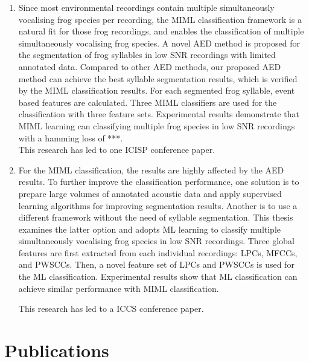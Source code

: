 \begin{enumerate}
\item Since most environmental recordings contain multiple simultaneously vocalising frog species per recording, the MIML classification framework is a natural fit for those frog recordings, and enables the classification of multiple simultaneously vocalising frog species. A novel AED method is proposed for the segmentation of frog syllables in low SNR recordings with limited annotated data. Compared to other AED methods, our proposed AED method can achieve the best syllable segmentation results, which is verified by the MIML classification results. For each segmented frog syllable, event based features are calculated. Three MIML classifiers are used for the classification with three feature sets.
Experimental results demonstrate that MIML learning can classifying multiple frog species in low SNR recordings with a hamming loss of ***.
\\
This research has led to one ICISP conference paper.

\item For the MIML classification, the results are highly affected by the AED results. To further improve the classification performance, one solution is to prepare large volumes of annotated acoustic data and apply supervised learning algorithms for improving segmentation results. Another is to use a different framework without the need of syllable segmentation. This thesis examines the latter option and adopts ML learning to classify multiple simultaneously vocalising frog species in low SNR recordings. Three global features are first extracted from each individual recordings: LPCs, MFCCs, and PWSCCs. Then, a novel feature set of LPCs and PWSCCs is used for the ML classification.  Experimental results show that ML classification can achieve similar performance with MIML classification. 

This research has led to a ICCS conference paper.


\end{enumerate}
 




\section{Publications}

